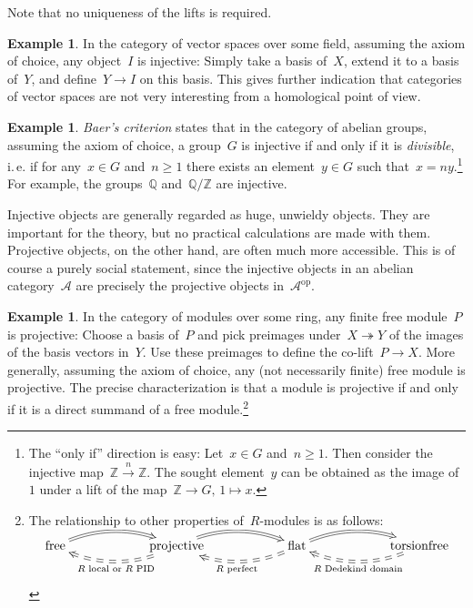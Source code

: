 \documentclass{amsart}
\makeatletter
\theoremstyle{definition}
\newtheorem{ex}[defn]{Example}
\theoremstyle{plain}
\theoremstyle{remark}
\newcommand{\ZZ}{\mathbb{Z}}
\newcommand{\A}{\mathcal{A}}
\newcommand{\QQ}{\mathbb{Q}}
\newcommand{\op}{\mathrm{op}}
\newcommand{\?}{\,{:}\,}
\renewcommand{\_}{\mathpunct{.}\,}
\newcommand{\ie}{i.\,e.\@\xspace}
\makeatother
\begin{document}
Note that no uniqueness of the lifts is required.

\begin{ex}In the category of vector spaces over some field, assuming the axiom
of choice, any object~$I$ is injective: Simply take a basis of~$X$, extend it to a
basis of~$Y$, and define~$Y \to I$ on this basis. This gives
further indication that categories of vector spaces are not very interesting
from a homological point of view.\end{ex}

\begin{ex}\emph{Baer's criterion} states that in the category of abelian
groups, assuming the axiom of choice, a group~$G$ is injective if and only if
it is \emph{divisible}, \ie if for any~$x \in G$ and~$n \geq 1$ there exists an
element~$y \in G$ such that~$x = ny$.\footnote{The ``only if'' direction is
easy: Let~$x \in G$ and~$n \geq 1$. Then consider the injective map~$\ZZ
\xrightarrow{n} \ZZ$. The sought element~$y$ can be obtained as the image
of~$1$ under a lift of the map~$\ZZ \to G,\,1 \mapsto x$.} For example, the
groups~$\QQ$ and~$\QQ/\ZZ$ are injective.
\end{ex}

Injective objects are generally regarded as huge, unwieldy objects. They are
important for the theory, but no practical calculations are made with them.
Projective objects, on the other hand, are often much more accessible. This is
of course a purely social statement, since the injective objects in an abelian
category~$\A$ are precisely the projective objects in~$\A^\op$.

\begin{ex}In the category of modules over some ring, any finite free module~$P$ is
projective: Choose a basis of~$P$ and pick preimages under~$X
\twoheadrightarrow Y$ of the images of the basis vectors in~$Y$. Use these
preimages to define the co-lift~$P \to X$. More generally, assuming the axiom
of choice, any (not necessarily finite) free module is projective. The precise
characterization is that a module is projective if and only if it is a direct
summand of a free module.\footnote{The relationship to other properties
of~$R$-modules is as follows: \\
\[ \xymatrixcolsep{5pc}\xymatrix{
  \text{free} \ar@/^1pc/@{=>}[r] &
  \text{projective} \ar@/^1pc/@{=>}[r] \ar@/^1pc/@{==>}[l]^{\text{$R$ local
  or $R$ PID}} &
  \text{flat} \ar@/^1pc/@{=>}[r] \ar@/^1pc/@{==>}[l]^{\text{$R$ perfect}} &
  \text{torsionfree} \ar@/^1pc/@{==>}[l]^{\text{$R$ Dedekind domain}}
} \]}\end{ex}
\end{document}
